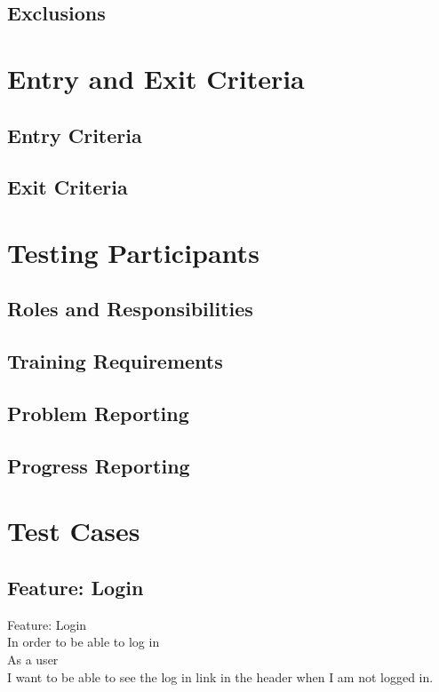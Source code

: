 \documentclass[12pt]{article}
\begin{document}
\subsection{Exclusions}

\section{Entry and Exit Criteria}
\subsection{Entry Criteria}
\subsection{Exit Criteria}

\section{Testing Participants}
\subsection{Roles and Responsibilities}
\subsection{Training Requirements}
\subsection{Problem Reporting}
\subsection{Progress Reporting}

\section{Test Cases}

\subsection{Feature: Login}

Feature: Login \\
  In order to be able to log in \\
  As a user \\
  I want to be able to see the log in link in the header when I am not logged in. \\
\end{document}
